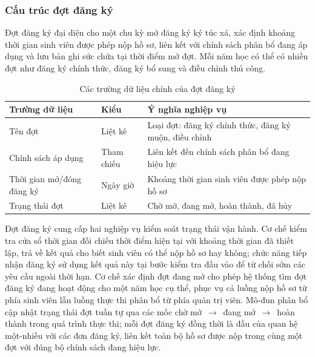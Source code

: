\documentclass[../DoAn.tex]{subfiles}
\begin{document}
\subsubsection{Cấu trúc đợt đăng ký}

Đợt đăng ký đại diện cho một chu kỳ mở đăng ký ký túc xá, xác định khoảng
thời gian sinh viên được phép nộp hồ sơ, liên kết với chính sách phân bổ đang
áp dụng và lưu bản ghi sức chứa tại thời điểm mở đợt. Mỗi năm học có thể có
nhiều đợt như đăng ký chính thức, đăng ký bổ sung và điều chỉnh thủ công.

\vspace{-6pt}
\begin{table}[H]
\centering
\caption{Các trường dữ liệu chính của đợt đăng ký}
\label{tab:class_cycle_attr}
\small
\begin{tabular}{|>{\raggedright\arraybackslash}p{4.6cm}|>{\raggedright\arraybackslash}p{1.8cm}|>{\raggedright\arraybackslash}p{7.0cm}|}
\hline
\textbf{Trường dữ liệu} & \textbf{Kiểu} & \textbf{Ý nghĩa nghiệp vụ} \\
\hline
Tên đợt & Liệt kê & Loại đợt: đăng ký chính thức, đăng ký muộn, điều chỉnh \\
\hline
Chính sách áp dụng & Tham chiếu & Liên kết đến chính sách phân bổ đang hiệu lực \\
\hline
Thời gian mở/đóng đăng ký & Ngày giờ & Khoảng thời gian sinh viên được phép nộp hồ sơ \\
\hline
Trạng thái đợt & Liệt kê & Chờ mở, đang mở, hoàn thành, đã hủy \\
\hline
\end{tabular}
\end{table}
\vspace{-4pt}

Đợt đăng ký cung cấp hai nghiệp vụ kiểm soát trạng thái vận hành. Cơ chế kiểm
tra cửa sổ thời gian đối chiếu thời điểm hiện tại với khoảng thời gian đã thiết
lập, trả về kết quả cho biết sinh viên có thể nộp hồ sơ hay không; chức năng
tiếp nhận đăng ký sử dụng kết quả này tại bước kiểm tra đầu vào để từ chối
sớm các yêu cầu ngoài thời hạn. Cơ chế xác định đợt đang mở cho phép hệ thống
tìm đợt đăng ký đang hoạt động cho một năm học cụ thể, phục vụ cả luồng nộp
hồ sơ từ phía sinh viên lẫn luồng thực thi phân bổ từ phía quản trị viên.
Mô-đun phân bổ cập nhật trạng thái đợt tuần tự qua các mốc chờ mở~$\to$~đang
mở~$\to$~hoàn thành trong quá trình thực thi; mỗi đợt đăng ký đồng thời là đầu
của quan hệ một-nhiều với các đơn đăng ký, liên kết toàn bộ hồ sơ được nộp
trong cùng một đợt với đúng bộ chính sách đang hiệu lực.
\end{document}
